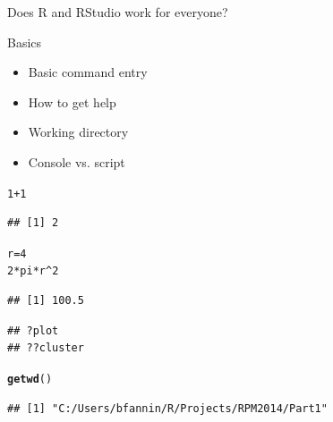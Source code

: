 \documentclass[xcolor=dvipsnames]{beamer}
\makeatletter
\newcommand{\hlnum}[1]{\textcolor[rgb]{0.686,0.059,0.569}{#1}}%
\newcommand{\hlopt}[1]{\textcolor[rgb]{0,0,0}{#1}}%
\newcommand{\hlstd}[1]{\textcolor[rgb]{0.345,0.345,0.345}{#1}}%
\newcommand{\hlkwb}[1]{\textcolor[rgb]{0.69,0.353,0.396}{#1}}%
\newcommand{\hlkwd}[1]{\textcolor[rgb]{0.737,0.353,0.396}{\textbf{#1}}}%
\newenvironment{kframe}{%
 \def\at@end@of@kframe{}%
 \ifinner\ifhmode%
  \def\at@end@of@kframe{\end{minipage}}%
  \begin{minipage}{\columnwidth}%
 \fi\fi%
 \def\FrameCommand##1{\hskip\@totalleftmargin \hskip-\fboxsep
 \colorbox{shadecolor}{##1}\hskip-\fboxsep
     \hskip-\linewidth \hskip-\@totalleftmargin \hskip\columnwidth}%
 \MakeFramed {\advance\hsize-\width
   \@totalleftmargin\z@ \linewidth\hsize
   \@setminipage}}%
 {\par\unskip\endMakeFramed%
 \at@end@of@kframe}
\newenvironment{knitrout}{}{} %
\makeatother
\begin{document}
\begin{frame}
Does R and RStudio work for everyone?
\end{frame}

\begin{frame}[fragile]{Basics}
  \begin{itemize}
    \item Basic command entry
    \item How to get help
    \item Working directory
    \item Console vs. script
  \end{itemize}
\end{frame}

\begin{frame}[fragile]
\begin{knitrout}\tiny
{}\color{fgcolor}\begin{kframe}
\begin{alltt}
\hlnum{1} \hlopt{+} \hlnum{1}
\end{alltt}
\begin{verbatim}
## [1] 2
\end{verbatim}
\begin{alltt}
\hlstd{r} \hlkwb{=} \hlnum{4}
\hlnum{2} \hlopt{*} \hlstd{pi} \hlopt{*} \hlstd{r}\hlopt{^}\hlnum{2}
\end{alltt}
\begin{verbatim}
## [1] 100.5
\end{verbatim}
\end{kframe}
\end{knitrout}

\begin{knitrout}\tiny
{}\color{fgcolor}\begin{kframe}
\begin{verbatim}
## ?plot
## ??cluster
\end{verbatim}
\end{kframe}
\end{knitrout}

\begin{knitrout}\tiny
{}\color{fgcolor}\begin{kframe}
\begin{alltt}
\hlkwd{getwd}\hlstd{()}
\end{alltt}
\begin{verbatim}
## [1] "C:/Users/bfannin/R/Projects/RPM2014/Part1"
\end{verbatim}
\end{kframe}
\end{knitrout}


\end{frame}
\end{document}
